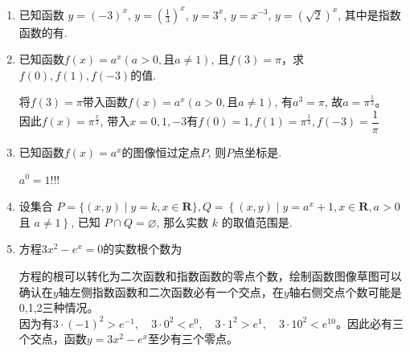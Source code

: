 \begin{enumerate}
    \item 已知函数 $y=(-3)^x$,  $y=(\frac{1}{3})^x$,  $y=3^x$,  $y=x^{-3}$,  $y=(\sqrt{2})^x$, 
    其中是指数函数的有. 
    \item 已知函数$f(x) = a^x (a>0, \mbox{且} a \neq 1)$, 且$f(3) = \pi$，求$f(0), f(1), f(-3)$的值.
    \begin{jieda}
        将$f(3) = \pi$带入函数$f(x) = a^x (a>0, \mbox{且} a \neq 1)$, 有$a^3 = \pi$, 故$a = \pi^\frac{1}{3}$。\\
        因此$f(x) = \pi^\frac{x}{3}$, 带入$x = 0, 1, -3$有$f(0) = 1, f(1) = \pi^\frac{1}{3}, f(-3) = \dfrac{1}{\pi}$
    \end{jieda}
    \item 已知函数$f(x)=a^{x}$的图像恒过定点$P$, 则$P$点坐标是. 
    \begin{jieda}
    $a^0=1$!!!
    \end{jieda}
    \item 设集合 $P=\{(x, y) \mid y=k, x \in \mathbf{R}\}, Q=\left\{(x, y) \mid y=a^x+1, x \in \mathbf{R}, a>0\right.$ 且 $\left.a \neq 1\right\}$, 已知 $P \cap Q=\varnothing$, 那么实数 $k$ 的取值范围是\blkda{$(-\infty,1]$}.
    
    \item 方程$3x^2 - e^x = 0$的实数根个数为
    \begin{jieda}
        方程的根可以转化为二次函数和指数函数的零点个数，绘制函数图像草图可以确认在$y$轴左侧指数函数和二次函数必有一个交点，在$y$轴右侧交点个数可能是0,1,2三种情况。\\
        因为有$3 \cdot (-1)^2 > e^{-1}, \quad 3 \cdot 0^2 < e^0,  \quad 3 \cdot 1^2 > e^{1}, \quad  3 \cdot 10^2 < e^{10}$。因此必有三个交点，函数$y = 3x^2-e^x$至少有三个零点。
    \end{jieda} 


\end{enumerate}
